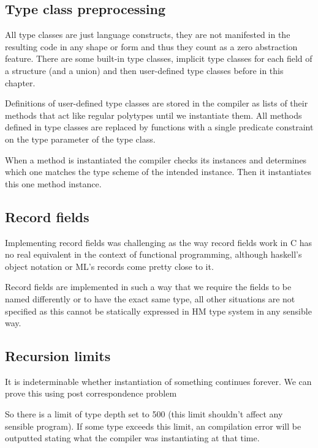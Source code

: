 \subsection{Type class preprocessing}

All type classes are just language constructs, they are not manifested in the resulting code in any shape or form and thus they count as a zero abstraction feature. There are some built-in type classes, %
implicit type classes for each field of a structure (and a union) and then user-defined type classes before in this chapter.

Definitions of user-defined type classes are stored in the compiler as lists of their methods that act like regular polytypes until we instantiate them. All methods defined in type classes are replaced by functions with a single predicate constraint on the type parameter of the type class.

When a method is instantiated the compiler checks its instances and determines which one matches the type scheme of the intended instance. Then it instantiates this one method instance.


\subsection{Record fields}

Implementing record fields was challenging as the way record fields work in C has no real equivalent in the context of functional programming, although haskell's object notation or ML's records come pretty close to it.

Record fields are implemented in such a way that we require the fields to be named differently or to have the exact same type, all other situations are not specified as this cannot be statically expressed in HM type system in any sensible way.

\subsection{Recursion limits}

It is indeterminable whether instantiation of something continues forever. We can prove this using post correspondence problem %

So there is a limit of type depth set to 500 (this limit shouldn't affect any sensible program).
If some type exceeds this limit, an compilation error will be outputted stating what the compiler was instantiating at that time.

